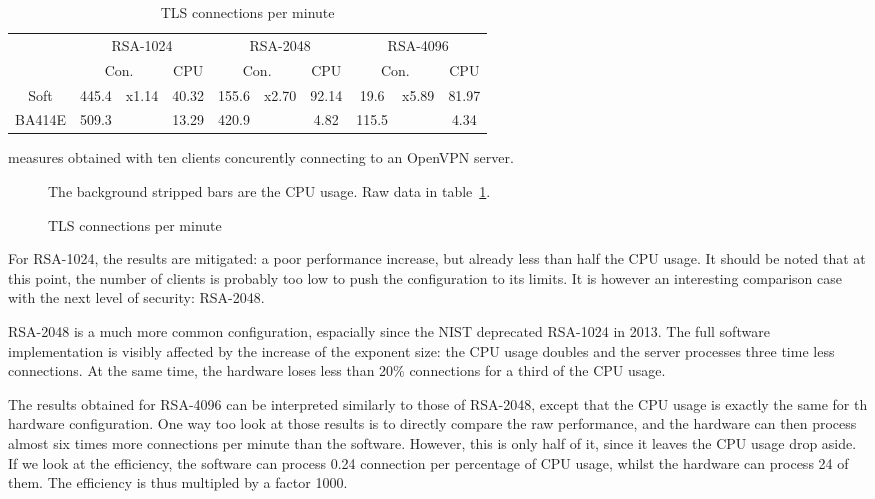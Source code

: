 \begin{table}[ht]
\center
\small
\begin{tabular}{l|c|c|c|c|c|c|c|c|c|} \cline{2-10}
 & \multicolumn{3}{c|}{RSA-1024} & \multicolumn{3}{c|}{RSA-2048} & \multicolumn{3}{c|}{RSA-4096} \\ \cline{2-10}
 & \multicolumn{2}{c|}{Con.} & CPU & \multicolumn{2}{c|}{Con.} & CPU & \multicolumn{2}{|c|}{Con.} & CPU \\ \hline
\multicolumn{1}{|c|}{Soft} & 445.4 & \multirow{2}{*}{x1.14} & 40.32 & 155.6& \multirow{2}{*}{x2.70}  & 92.14 & 19.6& \multirow{2}{*}{x5.89}  & 81.97 \\ \cline{1-2}\cline{4-5}\cline{7-8}\cline{10-10}
\multicolumn{1}{|c|}{BA414E} & 509.3 & & 13.29 & 420.9 & & 4.82 & 115.5 & & 4.34 \\ \hline
\end{tabular}
\caption{TLS connections per minute}{measures obtained with ten clients concurently connecting to an OpenVPN server.}
\label{tab:tls-con}
\end{table}

\begin{figure}[ht]
\center

\caption{TLS connections per minute}{The background stripped bars are the CPU usage. Raw data in table~\ref{tab:tls-con}.}
\label{fig:openvpn-tls-bench}
\end{figure}


\noindent For RSA-1024, the results are mitigated: a poor performance increase, but already less than half the CPU usage.
It should be noted that at this point, the number of clients is probably too low to push the configuration to its limits.
It is however an interesting comparison case with the next level of security: RSA-2048.

\noindent RSA-2048 is a much more common configuration, espacially since the NIST deprecated RSA-1024 in 2013.
The full software implementation is visibly affected by the increase of the exponent size: the CPU usage doubles and the server processes three time less connections.
At the same time, the hardware loses less than 20\% connections for a third of the CPU usage.

\noindent The results obtained for RSA-4096 can be interpreted similarly to those of RSA-2048, except that the CPU usage is exactly the same for th hardware configuration.
One way too look at those results is to directly compare the raw performance, and the hardware can then process almost six times more connections per minute than the software.
However, this is only half of it, since it leaves the CPU usage drop aside.
If we look at the efficiency, the software can process 0.24 connection per percentage of CPU usage, whilst the hardware can process 24 of them.
The efficiency is thus multipled by a factor 1000.

